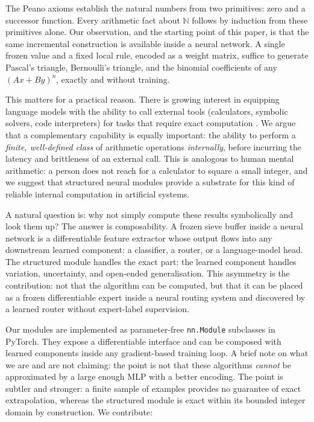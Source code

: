 \documentclass{article}
\begin{document}
The Peano axioms establish the natural numbers from two primitives: zero and a successor
function. Every arithmetic fact about $\mathbb{N}$ follows by induction from these
primitives alone. Our observation, and the starting point of this paper, is that the
same incremental construction is available inside a neural network. A single frozen
value and a fixed local rule, encoded as a weight matrix, suffice to generate Pascal's
triangle, Bernoulli's triangle, and the binomial coefficients of any $(Ax + By)^n$,
exactly and without training.

This matters for a practical reason. There is growing interest in equipping language
models with the ability to call external tools (calculators, symbolic solvers, code
interpreters) for tasks that require exact computation \citep{toolformer2023,
react2022}. We argue that a complementary capability is equally important: the ability
to perform a \emph{finite, well-defined class} of arithmetic operations \emph{internally},
before incurring the latency and brittleness of an external call. This is analogous
to human mental arithmetic: a person does not reach for a calculator to square a small
integer, and we suggest that structured neural modules provide a substrate for this kind
of reliable internal computation in artificial systems.

A natural question is: why not simply compute these results symbolically and look them
up? The answer is composability. A frozen sieve buffer inside a neural network is a
differentiable feature extractor whose output flows into any downstream learned
component: a classifier, a router, or a language-model head. The structured module handles
the exact part; the learned component handles variation, uncertainty, and open-ended
generalisation. This asymmetry is the contribution: not that the algorithm can be
computed, but that it can be placed as a frozen differentiable expert inside a neural
routing system and discovered by a learned router without expert-label supervision.

Our modules are implemented as parameter-free \texttt{nn.Module} subclasses in PyTorch.
They expose a differentiable interface and can be composed with learned components
inside any gradient-based training loop.
A brief note on what we are and are not claiming: the point is not that these
algorithms \emph{cannot} be approximated by a large enough MLP with a better encoding.
The point is subtler and stronger: a finite sample of examples provides no guarantee
of exact extrapolation, whereas the structured module is exact within its bounded
integer domain by construction.
We contribute:
\end{document}
